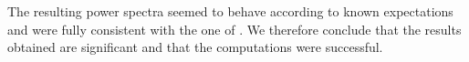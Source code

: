 \documentclass[twocolumn]{aastex62}
\begin{document}
The resulting power spectra seemed to behave according to known expectations and were fully consistent with the one of \cite{callin:2006}. We therefore conclude that the results obtained are significant and that the computations were successful.

\newpage


\end{document}
